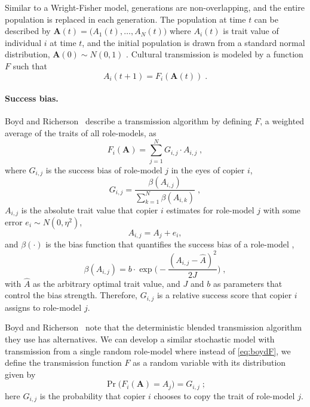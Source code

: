 \documentclass[12pt]{extarticle}
\let\vec\mathbf
\begin{document}
Similar to a Wright-Fisher model, generations are non-overlapping, and the entire population is replaced in each generation.
The population at time $t$ can be described by $\vec{A}(t)=\big(A_{1}(t), \ldots, A_{N}(t)\big)$ where $A_{i}(t)$ is trait value of individual $i$ at time $t$, and  the initial population is drawn from a standard normal distribution, $\vec{A}(0) \sim N(0,1)$ .
Cultural transmission is modeled by a function $F$ such that 
\begin{equation}\label{eq:transmission}
A_{i}(t+1) = F_i(\vec{A}(t)) \;.
\end{equation}

\paragraph{Success bias.}
Boyd and Richerson~\citep[Ch.~8, p.~247-249]{evolutionBook} describe a  transmission algorithm by defining $F$, a weighted average of the traits of all role-models, as
\begin{equation}\label{eq:boydF}
F_i(\vec{A}) = \sum_{j=1}^N G_{i,j}\cdot A_{i,j} \;, 
\end{equation}
where $G_{i,j}$ is the success bias of role-model $j$ in the eyes of copier $i$,
\begin{equation}\label{eq:boydG}
G_{i,j} = \frac{\beta(A_{i,j})}{\sum_{k=1}^{N} \beta(A_{i,k})} \;,
\end{equation}
$A_{i,j}$ is the absolute trait value {that} copier $i$ estimates for role-model $j$ with some error $e_i \sim N(0,\eta^2)$,
\begin{equation}\label{eq:relativeTrait}
A_{i,j} = A_j + e_i,
\end{equation}
and $\beta(\cdot)$ is the bias function that quantifies the success bias of a role-model \citep[eq.~5.11]{evolutionBook},
\begin{equation}\label{eq:success_bias}
\beta(A_{i,j}) = b \cdot \exp{\Big(-\frac{(A_{i,j} - \hat{A})^2}{2J}\Big)} \;,
\end{equation} 
with $\hat{A}$ as the arbitrary optimal trait value, and $J$ and $b$ as parameters that control the bias strength.
Therefore, $G_{i,j}$ is a relative success score that copier $i$ assigns to role-model $j$.

Boyd and Richerson~\citep{evolutionBook} note that the deterministic blended transmission algorithm they use has alternatives. We {can} develop a similar stochastic model with transmission from a single random role-model where instead of \cref{eq:boydF}, we define the transmission function $F$ as a random variable with its distribution given by 
\begin{equation}\label{eq:ourF}
\Pr\big(F_i(\vec{A}) = A_{j}\big) = G_{i,j} \;;
\end{equation}
{here $G_{i,j}$ is} the probability {that copier $i$ chooses} to copy the trait of role-model $j$.
\end{document}
